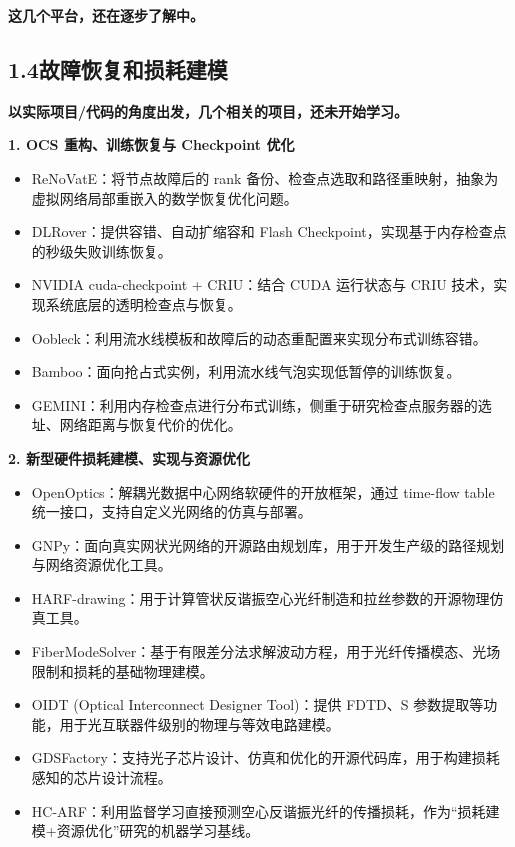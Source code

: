 \documentclass{sjtuweekly}
\begin{document}
\textbf{这几个平台，还在逐步了解中。}

\subsection*{1.4\quad 故障恢复和损耗建模}

\textbf{以实际项目/代码的角度出发，几个相关的项目，还未开始学习。}

\textbf{1. OCS 重构、训练恢复与 Checkpoint 优化}

\begin{itemize}
  \item {ReNoVatE}：将节点故障后的 rank 备份、检查点选取和路径重映射，抽象为虚拟网络局部重嵌入的数学恢复优化问题。
  \item {DLRover}：提供容错、自动扩缩容和 Flash Checkpoint，实现基于内存检查点的秒级失败训练恢复。
  \item {NVIDIA cuda-checkpoint + CRIU}：结合 CUDA 运行状态与 CRIU 技术，实现系统底层的透明检查点与恢复。
  \item {Oobleck}：利用流水线模板和故障后的动态重配置来实现分布式训练容错。
  \item {Bamboo}：面向抢占式实例，利用流水线气泡实现低暂停的训练恢复。
  \item {GEMINI}：利用内存检查点进行分布式训练，侧重于研究检查点服务器的选址、网络距离与恢复代价的优化。
\end{itemize}

\textbf{2. 新型硬件损耗建模、实现与资源优化}

\begin{itemize}
  \item {OpenOptics}：解耦光数据中心网络软硬件的开放框架，通过 time-flow table 统一接口，支持自定义光网络的仿真与部署。
  \item {GNPy}：面向真实网状光网络的开源路由规划库，用于开发生产级的路径规划与网络资源优化工具。
  \item {HARF-drawing}：用于计算管状反谐振空心光纤制造和拉丝参数的开源物理仿真工具。
  \item {FiberModeSolver}：基于有限差分法求解波动方程，用于光纤传播模态、光场限制和损耗的基础物理建模。
  \item {OIDT (Optical Interconnect Designer Tool)}：提供 FDTD、S 参数提取等功能，用于光互联器件级别的物理与等效电路建模。
  \item {GDSFactory}：支持光子芯片设计、仿真和优化的开源代码库，用于构建损耗感知的芯片设计流程。
  \item {HC-ARF}：利用监督学习直接预测空心反谐振光纤的传播损耗，作为“损耗建模+资源优化”研究的机器学习基线。
\end{itemize}
\end{document}
